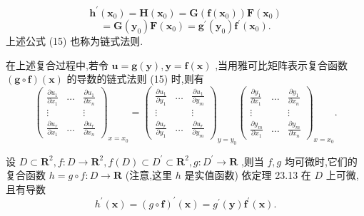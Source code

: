 \[
{\mathbf{h}}^{\prime }\left( {\mathbf{x}}_{0}\right)  = \mathbf{H}\left( {\mathbf{x}}_{0}\right)  = \mathbf{G}\left( {\mathbf{f}\left( {\mathbf{x}}_{0}\right) }\right) \mathbf{F}\left( {\mathbf{x}}_{0}\right)
\]
\[
= \mathbf{G}\left( {\mathbf{y}}_{0}\right) \mathbf{F}\left( {\mathbf{x}}_{0}\right)  = {\mathbf{g}}^{\prime }\left( {\mathbf{y}}_{0}\right) {\mathbf{f}}^{\prime }\left( {\mathbf{x}}_{0}\right) .
\]
上述公式 (15) 也称为链式法则.

在上述复合过程中,若令 \(\mathbf{u} = \mathbf{g}\left( \mathbf{y}\right) ,\mathbf{y} = \mathbf{f}\left( \mathbf{x}\right)\) ,当用雅可比矩阵表示复合函数 \(\left( {\mathbf{g} \circ  \mathbf{f}}\right) \left( \mathbf{x}\right)\) 的导数的链式法则 (15) 时,则有
\[
{\left( \begin{matrix} \frac{\partial {u}_{1}}{\partial {x}_{1}} & \ldots & \frac{\partial {u}_{1}}{\partial {x}_{n}} \\  \vdots & & \vdots \\  \frac{\partial {u}_{r}}{\partial {x}_{1}} & \ldots & \frac{\partial {u}_{r}}{\partial {x}_{n}} \end{matrix}\right) }_{x = {x}_{0}} = {\left( \begin{matrix} \frac{\partial {u}_{1}}{\partial {y}_{1}} & \ldots & \frac{\partial {u}_{1}}{\partial {y}_{m}} \\  \vdots & & \vdots \\  \frac{\partial {u}_{r}}{\partial {y}_{1}} & \ldots & \frac{\partial {u}_{r}}{\partial {y}_{m}} \end{matrix}\right) }_{y = {y}_{0}}{\left( \begin{matrix} \frac{\partial {y}_{1}}{\partial {x}_{1}} & \ldots & \frac{\partial {y}_{1}}{\partial {x}_{n}} \\  \vdots & & \vdots \\  \frac{\partial {y}_{m}}{\partial {x}_{1}} & \ldots & \frac{\partial {y}_{m}}{\partial {x}_{n}} \end{matrix}\right) }_{x = {x}_{0}}. \tag{17}
\]
\begin{example}

\end{example}
设 \(D \subset  {\mathbf{R}}^{2},f : D \rightarrow  {\mathbf{R}}^{2},f\left( D\right)  \subset  {D}^{\prime } \subset  {\mathbf{R}}^{2},g : {D}^{\prime } \rightarrow  \mathbf{R}\) ,则当 \(f,g\) 均可微时,它们的复合函数 \(h = g \circ  f : D \rightarrow  \mathbf{R}\) (注意,这里 \(h\) 是实值函数) 依定理 23.13 在 \(D\) 上可微,且有导数
\[
{h}^{\prime }\left( \mathbf{x}\right)  = {\left( g \circ  \mathbf{f}\right) }^{\prime }\left( \mathbf{x}\right)  = {g}^{\prime }\left( \mathbf{y}\right) {\mathbf{f}}^{\prime }\left( \mathbf{x}\right) .
\]
